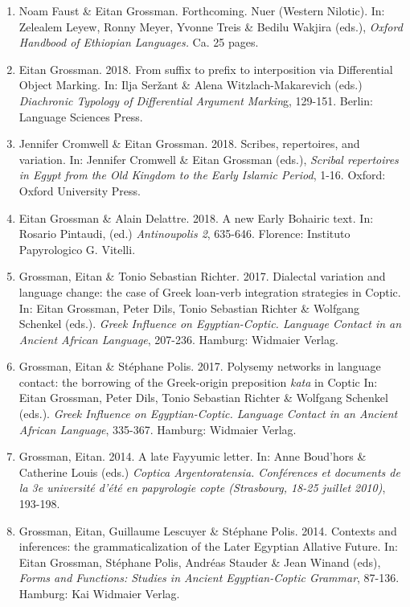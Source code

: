 \documentclass[letterpaper,11pt]{article}
\begin{document}
\begin{enumerate}[resume]
\item Noam Faust \& Eitan Grossman. Forthcoming. Nuer (Western Nilotic). In: Zelealem Leyew, Ronny Meyer, Yvonne Treis \& Bedilu Wakjira (eds.), \textit{Oxford Handbood of Ethiopian Languages.} Ca. 25 pages.

\item	Eitan Grossman. 2018. From suffix to prefix to interposition via Differential Object Marking. In: Ilja Ser\v{z}ant \& Alena Witzlach-Makarevich (eds.) \textit{Diachronic Typology of Differential Argument Markin}g, 129-151. Berlin: Language Sciences Press.

\item Jennifer Cromwell \& Eitan Grossman. 2018. Scribes, repertoires, and variation. In: Jennifer Cromwell \& Eitan Grossman (eds.), \textit{Scribal repertoires in Egypt from the Old Kingdom to the Early Islamic Period}, 1-16. Oxford: Oxford University Press.

\item Eitan Grossman \& Alain Delattre. 2018. A new Early Bohairic text. In: Rosario Pintaudi, (ed.) \textit{Antinoupolis 2}, 635-646. Florence: Instituto Papyrologico G. Vitelli.

\item	Grossman, Eitan \& Tonio Sebastian Richter. 2017. Dialectal variation and language change: the case of Greek loan-verb integration strategies in Coptic. In: Eitan Grossman, Peter Dils, Tonio Sebastian Richter \& Wolfgang Schenkel (eds.). \textit{Greek Influence on Egyptian-Coptic. Language Contact in an Ancient African Language}, 207-236. Hamburg: Widmaier Verlag.

\item	Grossman, Eitan \& St\'ephane Polis. 2017. Polysemy networks in language contact: the borrowing of the Greek-origin preposition \textit{kata} in Coptic In: Eitan Grossman, Peter Dils, Tonio Sebastian Richter \& Wolfgang Schenkel (eds.). \textit{Greek Influence on Egyptian-Coptic. Language Contact in an Ancient African Language}, 335-367. Hamburg: Widmaier Verlag.

\item Grossman, Eitan. 2014. A late Fayyumic letter. In: Anne Boud’hors \& Catherine Louis (eds.) \textit{Coptica Argentoratensia. Conférences et documents de la 3e université d'été en papyrologie copte (Strasbourg, 18-25 juillet 2010)},  193-198.

\item Grossman, Eitan, Guillaume Lescuyer \& St\'ephane Polis. 2014. Contexts and inferences: the grammaticalization of the Later Egyptian Allative Future. In: Eitan Grossman, St\'ephane Polis, Andr\'eas Stauder \& Jean Winand (eds), \textit{Forms and Functions: Studies in Ancient Egyptian-Coptic Grammar}, 87-136. Hamburg: Kai Widmaier Verlag. 


\end{enumerate}
\end{document}
